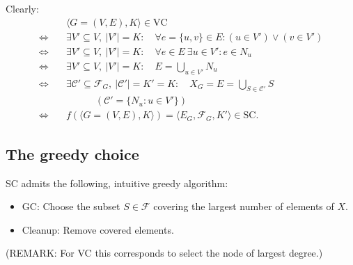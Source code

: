 Clearly:
\begin{align*}
&\langle G=(V,E),K\rangle\in\mathrm{VC}\\
\Longleftrightarrow\quad&\exists V'\subseteq V,\ |V'|=K:\quad
\forall e=\{u,v\}\in E:(u\in V')\vee(v\in V')\\
\Longleftrightarrow\quad&\exists V'\subseteq V,\ |V'|=K:\quad
\forall e\in E\ \exists u\in V':e\in N_u\\
\Longleftrightarrow\quad&\exists V'\subseteq V,\ |V'|=K:\quad E=\bigcup_{u\in V'}N_u\\
\Longleftrightarrow\quad&\exists\mathcal C'\subseteq\mathcal F_G,\ |\mathcal C'|=K'=K:\quad
X_G=E=\bigcup_{S\in\mathcal C'}S\\[-2pt]
&\hspace{3em}(\mathcal C'=\{N_u:u\in V'\})\\
\Longleftrightarrow\quad&f(\langle G=(V,E),K\rangle)=\langle E_G,\mathcal F_G,K'\rangle\in\mathrm{SC}.
\end{align*}
\subsection{The greedy choice}
SC admits the following, intuitive greedy algorithm:
\begin{itemize}
\item GC: Choose the subset $S\in\mathcal F$ covering the largest number of elements of $X$.
\item Cleanup: Remove covered elements.
\end{itemize}
(REMARK: For VC this corresponds to select the node of largest degree.)

